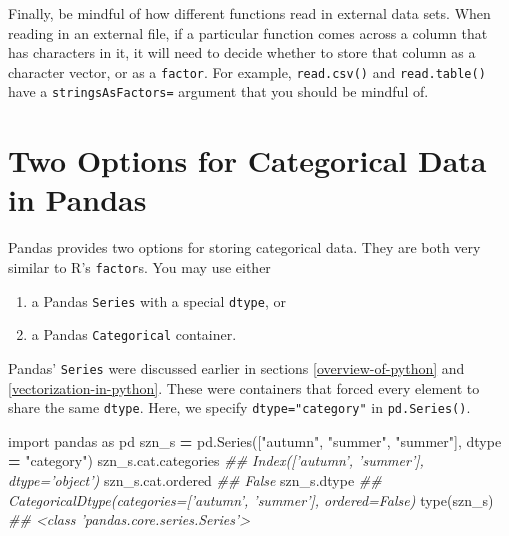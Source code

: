 \documentclass[12pt,krantz2]{krantz}
\makeatletter
\newenvironment{Shaded}{\begin{snugshade}}{\end{snugshade}}
\newcommand{\BuiltInTok}[1]{#1}
\newcommand{\CommentTok}[1]{\textcolor[rgb]{0.37,0.37,0.37}{\textit{#1}}}
\newcommand{\ImportTok}[1]{#1}
\newcommand{\NormalTok}[1]{#1}
\newcommand{\OperatorTok}[1]{\textcolor[rgb]{0.43,0.43,0.43}{\textbf{#1}}}
\newcommand{\StringTok}[1]{\textcolor[rgb]{0.5,0.5,0.5}{#1}}
\providecommand{\tightlist}{%
  \setlength{\itemsep}{0pt}\setlength{\parskip}{0pt}}
\newenvironment{kframe}{%
\medskip{}
\setlength{\fboxsep}{.8em}
 \def\at@end@of@kframe{}%
 \ifinner\ifhmode%
  \def\at@end@of@kframe{\end{minipage}}%
  \begin{minipage}{\columnwidth}%
 \fi\fi%
 \def\FrameCommand##1{\hskip\@totalleftmargin \hskip-\fboxsep
 \colorbox{shadecolor}{##1}\hskip-\fboxsep
     \hskip-\linewidth \hskip-\@totalleftmargin \hskip\columnwidth}%
 \MakeFramed {\advance\hsize-\width
   \@totalleftmargin\z@ \linewidth\hsize
   \@setminipage}}%
 {\par\unskip\endMakeFramed%
 \at@end@of@kframe}
\renewenvironment{Shaded}{\begin{kframe}}{\end{kframe}}
\makeatother
\begin{document}
Finally, be mindful of how different functions read in external data sets. When reading in an external file, if a particular function comes across a column that has characters in it, it will need to decide whether to store that column as a character vector, or as a \texttt{factor}. For example, \texttt{read.csv()} and \texttt{read.table()} have a \texttt{stringsAsFactors=} argument that you should be mindful of.

\hypertarget{two-options-for-categorical-data-in-pandas}{%
\section{Two Options for Categorical Data in Pandas}\label{two-options-for-categorical-data-in-pandas}}

Pandas provides two options for storing categorical data. They are both very similar to R's \texttt{factor}s. You may use either

\begin{enumerate}
\def\labelenumi{\arabic{enumi}.}
\tightlist
\item
  a Pandas \texttt{Series} with a special \texttt{dtype}, or
\item
  a Pandas \texttt{Categorical} container.
\end{enumerate}

Pandas' \texttt{Series} were discussed earlier in sections \ref{overview-of-python} and \ref{vectorization-in-python}. These were containers that forced every element to share the same \texttt{dtype}. Here, we specify \texttt{dtype="category"} in \texttt{pd.Series()}.

\begin{Shaded}
\begin{Highlighting}[]
\ImportTok{import}\NormalTok{ pandas }\ImportTok{as}\NormalTok{ pd}
\NormalTok{szn_s }\OperatorTok{=}\NormalTok{ pd.Series([}\StringTok{"autumn"}\NormalTok{, }\StringTok{"summer"}\NormalTok{, }\StringTok{"summer"}\NormalTok{], dtype }\OperatorTok{=} \StringTok{"category"}\NormalTok{) }
\NormalTok{szn_s.cat.categories}
\CommentTok{## Index(['autumn', 'summer'], dtype='object')}
\NormalTok{szn_s.cat.ordered}
\CommentTok{## False}
\NormalTok{szn_s.dtype}
\CommentTok{## CategoricalDtype(categories=['autumn', 'summer'], ordered=False)}
\BuiltInTok{type}\NormalTok{(szn_s)}
\CommentTok{## <class 'pandas.core.series.Series'>}
\end{Highlighting}
\end{Shaded}
\end{document}

